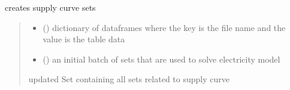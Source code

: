 \documentclass[letterpaper,10pt,english]{sphinxmanual}
\begin{document}
\begin{fulllineitems}
\label{\detokenize{src.models.electricity.scripts.preprocessor:src.models.electricity.scripts.preprocessor.create_sc_sets}}
\pysigstartsignatures
\pysiglinewithargsret
{}
{\sphinxparamcomma {}}
{}
\pysigstopsignatures
\sphinxAtStartPar
creates supply curve sets
\begin{quote}\begin{description}
\begin{itemize}
\item {} 
\sphinxAtStartPar
{} () \textendash{} dictionary of dataframes where the key is the file name and the value is the table data

\item {} 
\sphinxAtStartPar
{} ({\hyperref[\detokenize{src.models.electricity.scripts.preprocessor:src.models.electricity.scripts.preprocessor.Sets}]{}}) \textendash{} an initial batch of sets that are used to solve electricity model

\end{itemize}

\sphinxAtStartPar
updated Set containing all sets related to supply curve

\sphinxAtStartPar
{\hyperref[\detokenize{src.models.electricity.scripts.preprocessor:src.models.electricity.scripts.preprocessor.Sets}]{}}

\end{description}\end{quote}

\end{fulllineitems}

\end{document}
